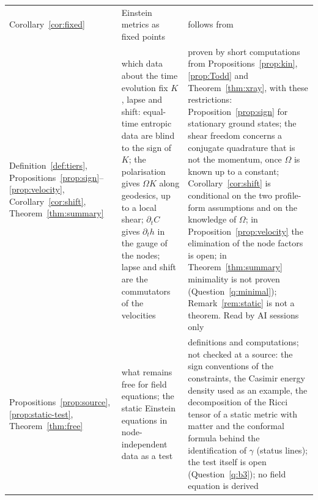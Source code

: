 \documentclass[11pt,a4paper]{article}
\theoremstyle{stmt}
\theoremstyle{defn}
\theoremstyle{rmk}
\numberwithin{equation}{section}
\begin{document}
{\begin{longtable}{@{}>{\raggedright\arraybackslash}p{}>{\raggedright\arraybackslash}p{}>{\raggedright\arraybackslash}p{}@{}}
Corollary~\ref{cor:fixed} & Einstein metrics as fixed points & follows from \cite{BBG}\\
Definition~\ref{def:tiers}, Propositions~\ref{prop:sign}--\ref{prop:velocity}, Corollary~\ref{cor:shift}, Theorem~\ref{thm:summary} & which data about the time evolution fix $K$, lapse and shift: equal-time entropic data are blind to the sign of $K$; the polarisation gives $\Omega K$ along geodesics, up to a local shear; $\partial_tC$ gives $\partial_th$ in the gauge of the nodes; lapse and shift are the commutators of the velocities & proven by short computations from Propositions~\ref{prop:kin}, \ref{prop:Todd} and Theorem~\ref{thm:xray}, with these restrictions: Proposition~\ref{prop:sign} for stationary ground states; the shear freedom concerns a conjugate quadrature that is not the momentum, once $\Omega$ is known up to a constant; Corollary~\ref{cor:shift} is conditional on the two profile-form assumptions and on the knowledge of $\Omega$; in Proposition~\ref{prop:velocity} the elimination of the node factors is open; in Theorem~\ref{thm:summary} minimality is not proven (Question~\ref{q:minimal}); Remark~\ref{rem:static} is not a theorem. Read by AI sessions only\\
Propositions~\ref{prop:source}, \ref{prop:static-test}, Theorem~\ref{thm:free} & what remains free for field equations; the static Einstein equations in node-independent data as a test & definitions and computations; not checked at a source: the sign conventions of the constraints, the Casimir energy density used as an example, the decomposition of the Ricci tensor of a static metric with matter and the conformal formula behind the identification of $\gamma$ (status lines); the test itself is open (Question~\ref{q:b3}); no field equation is derived\\

\end{longtable}}
\end{document}
